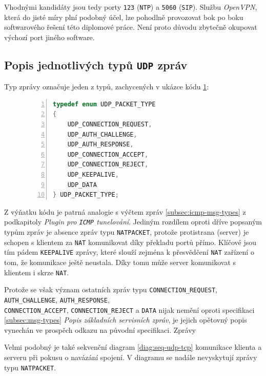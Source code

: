\documentclass[thesis=M,czech]{FITthesis}[2012/10/20]
\begin{document}
Vhodnými kandidáty jsou tedy porty \texttt{123} (\texttt{NTP}) a \texttt{5060} (\texttt{SIP}). Službu \mbox{\textit{OpenVPN}}, která do jisté míry plní podobný účel, lze pohodlně provozovat bok po boku softwarového řešení této diplomové práce. Není proto důvodu zbytečně okupovat výchozí port jiného software.
    
    \subsection{Popis jednotlivých typů \texttt{UDP} zpráv}
        
    Typ zprávy označuje jeden z typů, zachycených v ukázce kódu \ref{code:udp-types}:
        
    \begin{figure}[h]
	\begin{lstlisting}[caption=Výňatek souboru \texttt{plugins/udp/packet.h} definující typy \texttt{UDP} zpráv,language=c,frame=single,numbers=left]
typedef enum UDP_PACKET_TYPE
{
	UDP_CONNECTION_REQUEST,
	UDP_AUTH_CHALLENGE,
	UDP_AUTH_RESPONSE,
	UDP_CONNECTION_ACCEPT,
	UDP_CONNECTION_REJECT,
	UDP_KEEPALIVE,
	UDP_DATA
} UDP_PACKET_TYPE;
      \end{lstlisting}
      \label{code:udp-types}
    \end{figure}

    Z výňatku kódu je patrná analogie s výčtem zpráv \ref{subsec:icmp-msg-types} z podkapitoly \textit{Plugin pro \texttt{ICMP} tunelování}. Jediným rozdílem oproti dříve popsaným typům zpráv je absence zpráv typu \texttt{NATPACKET}, protože protistrana (server) je schopen s klientem za \texttt{NAT} komunikovat díky překladu portů přímo. Klíčové jsou tím pádem \texttt{KEEPALIVE} zprávy, které slouží zejména k přesvědčení \texttt{NAT} zařízení o tom, že komunikace ještě neustala. Díky tomu může server komunikovat s klientem i skrze \texttt{NAT}.
    
    Protože se však význam ostatních zpráv typu \texttt{CONNECTION\_REQUEST}, \texttt{AUTH\_CHALLENGE}, \texttt{AUTH\_RESPONSE},\\ \texttt{CONNECTION\_ACCEPT}, \texttt{CONNECTION\_REJECT} a \texttt{DATA} nijak nemění oproti specifikaci \ref{subsec:msg-types} \textit{Popis základních servisních zpráv}, je jejich opětovný popis vynechán ve prospěch odkazu na původní specifikaci.
     Zprávy 

    Velmi podobný je také sekvenční diagram \ref{diag:seq-udp-tcp} komunikace klienta a serveru při pokusu o navázání spojení. V diagramu se nadále nevyskytují zprávy typu \texttt{NATPACKET}.
    
\end{document}
